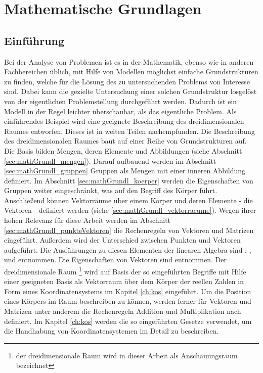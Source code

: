 \chapter{Mathematische Grundlagen}\label{ch:mathGrundl}
\section{Einf\"uhrung}\label{sec:mathGrundl_einfuehrung}
    Bei der Analyse von Problemen ist es in der Mathematik, ebenso wie in anderen Fachbereichen \"ublich, mit Hilfe von Modellen m\"oglichst einfache Grundstrukturen zu finden, welche f\"ur die L\"osung des zu untersuchenden Problems von Interesse sind. Dabei kann die gezielte Untersuchung einer solchen Grundstruktur losgel\"ost von der eigentlichen Problemstellung durchgef\"uhrt werden. Dadurch ist ein Modell in der Regel leichter \"uberschaubar, als das eigentliche Problem. \hfill \newline
    Als einf\"uhrendes Beispiel wird eine geeignete Beschreibung des dreidimensionalen Raumes entworfen. Dieses ist in weiten Teilen \cite{Bosch2014} nachempfunden. \hfill \newline
    Die Beschreibung des dreidimensionalen Raumes baut auf einer Reihe von Grundstrukturen auf. Die Basis bilden Mengen, deren Elemente und Abbildungen (siehe Abschnitt \ref{sec:mathGrundl_mengen}). Darauf aufbauend werden im Abschnitt \ref{sec:mathGrundl_gruppen} Gruppen als Mengen mit einer inneren Abbildung  definiert. Im Abschnitt \ref{sec:mathGrundl_koerper} werden die Eigenschaften von Gruppen weiter eingeschr\"ankt, was auf den Begriff des K\"orper f\"uhrt. Anschlie\ss{}end k\"onnen Vektorr\"aume \"uber einem K\"orper und deren Elemente - die Vektoren - definiert werden (siehe \ref{sec:mathGrundl_vektorraeume}). Wegen ihrer hohen Relevanz f\"ur diese Arbeit werden im Abschnitt \ref{sec:mathGrundl_punkteVektoren} die Rechenregeln von Vektoren und Matrizen eingef\"uhrt. Au\ss{}erdem wird der Unterschied zwischen Punkten und Vektoren aufgef\"uhrt. Die Ausf\"uhrungen zu diesen Elementen der linearen Algebra sind \cite{Bosch2014}, \cite{MatthiasPlaue2009}, \cite{Asser1975} und \cite{Modler2011d} entnommen. Die Eigenschaften von Vektoren sind \cite{Papula2014} entnommen. \newline
    Der dreidimensionale Raum \footnote{der dreidimensionale Raum wird in dieser Arbeit als Anschauungsraum bezeichnet} wird auf Basis der so eingef\"uhrten Begriffe mit Hilfe einer geeigneten Basis als Vektorraum \"uber dem K\"orper der reellen Zahlen in Form eines Koordinatensystems im Kapitel \ref{ch:kos} eingef\"uhrt.   \newline
    Um die Position eines K\"orpers im Raum beschreiben zu k\"onnen, werden ferner f\"ur Vektoren und Matrizen unter anderem die Rechenregeln Addition und Multiplikation nach \cite{Papula2014} definiert. Im Kapitel \ref{ch:kos} werden die so eingef\"uhrten Gesetze verwendet, um die Handhabung von Koordinatensystemen im Detail zu beschreiben. \newline
    
